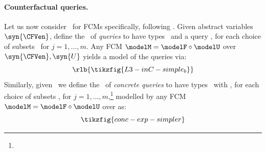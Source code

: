 \documentclass{article}
\begin{document}
\paragraph{Counterfactual queries.}
Let us now consider \ for FCMs specifically, following \cite{xia2024neural}. 
Given abstract variables $\syn{\CFVen}$, 
define the \ of \emph{\CF{} queries} to have types \rlb{$\syn{\CFVen}$}\ and a query , for each choice of subsets \ for $j=1,\dots,m$.
Any FCM $\modelM = \modelF \circ \modelU$ over $\syn{\CFVen}, \syn{U}$ yields a model of the queries via:
\begin{equation} \label{eq:l3-expression-abstract}
\rlb{\tikzfig{L3-inC-simple_b}}
\end{equation} 
Similarly, given \ 
we define the \ of \emph{concrete \CF{} queries} 
to have types \ with , for each choice of subsets  ,  for $j=1,\dots,m$,\footnote{} modelled by any FCM $\modelM = \modelF \circ \modelU$  over  as: 
\[
\tikzfig{conc-exp-simpler}
\]
\end{document}
